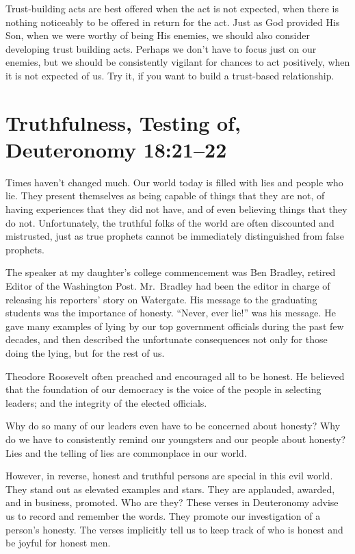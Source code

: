 \documentclass[12pt]{memoir}
\begin{document}
Trust-building acts are best offered when the act is not expected,
when there is nothing noticeably to be offered in return for the act.
Just as God provided His Son, when we were worthy of being His enemies,
we should also consider developing trust building acts. Perhaps
we don't have to focus just on our enemies, but we should be consistently
vigilant for chances to act positively, when it is not expected
of us. Try it, if you want to build a trust-based relationship. 

\section[Truthfulness, Testing of]{Truthfulness, Testing of, Deuteronomy 18:21--22}

Times haven't changed much. Our world today is filled with lies and people who lie. They present themselves as being capable of things that they are not, of having experiences that they did not have, and of even believing things that they do not. Unfortunately, the truthful folks of the world are often discounted and mistrusted, just as true prophets cannot be immediately distinguished from false prophets.

The speaker at my daughter's college commencement was Ben Bradley, retired Editor of the Washington Post. Mr.\ Bradley had been the editor in charge of releasing his reporters' story on Watergate. His message to the graduating students was the importance of honesty.
``Never, ever lie!'' was his message. He gave many examples of lying by our top government officials during the past few decades, and then described the unfortunate consequences not only for those doing the lying, but for the rest of us. 

Theodore Roosevelt often preached and encouraged all to be honest. He believed that the foundation of our democracy is the voice of the people in selecting leaders; and the integrity of the elected officials. 

Why do so many of our leaders even have to be concerned about honesty?
Why do we have to consistently remind our youngsters and our people
about honesty? Lies and the telling of lies are commonplace in our
world.

However, in reverse, honest and truthful persons are special in this
evil world. They stand out as elevated examples and stars. They are
applauded, awarded, and in business, promoted. Who are they? These
verses in Deuteronomy advise us to record and remember the words.
They promote our investigation of a person's honesty. The verses implicitly tell us to keep track of who is honest and be joyful for honest men.
\end{document}
